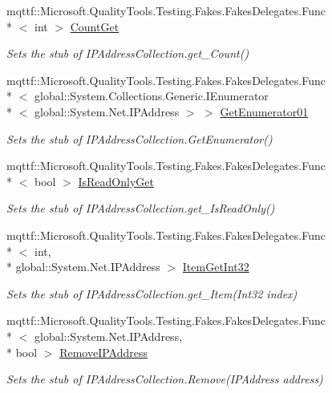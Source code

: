 \begin{DoxyCompactItemize}
mqttf\-::\-Microsoft.\-Quality\-Tools.\-Testing.\-Fakes.\-Fakes\-Delegates.\-Func\\*
$<$ int $>$ \hyperlink{class_system_1_1_net_1_1_network_information_1_1_fakes_1_1_stub_i_p_address_collection_a57022128b87414e3efcefe9649e764ad}{Count\-Get}
\begin{DoxyCompactList}\small\item\em Sets the stub of I\-P\-Address\-Collection.\-get\-\_\-\-Count()\end{DoxyCompactList}\item 
mqttf\-::\-Microsoft.\-Quality\-Tools.\-Testing.\-Fakes.\-Fakes\-Delegates.\-Func\\*
$<$ global\-::\-System.\-Collections.\-Generic.\-I\-Enumerator\\*
$<$ global\-::\-System.\-Net.\-I\-P\-Address $>$ $>$ \hyperlink{class_system_1_1_net_1_1_network_information_1_1_fakes_1_1_stub_i_p_address_collection_a2292a946af9eda2316a20e6c17d7f45c}{Get\-Enumerator01}
\begin{DoxyCompactList}\small\item\em Sets the stub of I\-P\-Address\-Collection.\-Get\-Enumerator()\end{DoxyCompactList}\item 
mqttf\-::\-Microsoft.\-Quality\-Tools.\-Testing.\-Fakes.\-Fakes\-Delegates.\-Func\\*
$<$ bool $>$ \hyperlink{class_system_1_1_net_1_1_network_information_1_1_fakes_1_1_stub_i_p_address_collection_ae05d8bb79a96ae985b19c8db49c64a2d}{Is\-Read\-Only\-Get}
\begin{DoxyCompactList}\small\item\em Sets the stub of I\-P\-Address\-Collection.\-get\-\_\-\-Is\-Read\-Only()\end{DoxyCompactList}\item 
mqttf\-::\-Microsoft.\-Quality\-Tools.\-Testing.\-Fakes.\-Fakes\-Delegates.\-Func\\*
$<$ int, \\*
global\-::\-System.\-Net.\-I\-P\-Address $>$ \hyperlink{class_system_1_1_net_1_1_network_information_1_1_fakes_1_1_stub_i_p_address_collection_af837a9f64b96301fafc3507eedecb678}{Item\-Get\-Int32}
\begin{DoxyCompactList}\small\item\em Sets the stub of I\-P\-Address\-Collection.\-get\-\_\-\-Item(\-Int32 index)\end{DoxyCompactList}\item 
mqttf\-::\-Microsoft.\-Quality\-Tools.\-Testing.\-Fakes.\-Fakes\-Delegates.\-Func\\*
$<$ global\-::\-System.\-Net.\-I\-P\-Address, \\*
bool $>$ \hyperlink{class_system_1_1_net_1_1_network_information_1_1_fakes_1_1_stub_i_p_address_collection_ac3e5884c7766f126be7b44cca93f6ac8}{Remove\-I\-P\-Address}
\begin{DoxyCompactList}\small\item\em Sets the stub of I\-P\-Address\-Collection.\-Remove(\-I\-P\-Address address)\end{DoxyCompactList}\end{DoxyCompactItemize}
